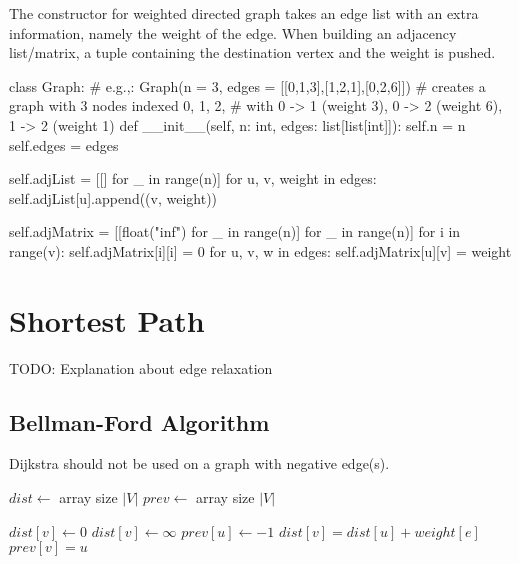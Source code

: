 The constructor for weighted directed graph takes an edge list with an extra information, namely the weight of the edge.
When building an adjacency list/matrix, a tuple containing the destination vertex and the weight is pushed.

\begin{python}
class Graph:
    # e.g.,: Graph(n = 3, edges = [[0,1,3],[1,2,1],[0,2,6]])
    # creates a graph with 3 nodes indexed 0, 1, 2,
    # with 0 -> 1 (weight 3), 0 -> 2 (weight 6), 1 -> 2 (weight 1)
    def __init__(self, n: int, edges: list[list[int]]):
        self.n = n
        self.edges = edges

        self.adjList = [[] for _ in range(n)]
        for u, v, weight in edges:
            self.adjList[u].append((v, weight))

        self.adjMatrix = [[float("inf") for _ in range(n)] for _ in range(n)]
        for i in range(v):
            self.adjMatrix[i][i] = 0
        for u, v, w in edges:
            self.adjMatrix[u][v] = weight
\end{python}

\section{Shortest Path}

TODO: Explanation about edge relaxation

\subsection{Bellman-Ford Algorithm}

Dijkstra should not be used on a graph with negative edge(s).

\noindent \hrulefill
\begin{algorithmic}[1]
   
    \State $dist \gets$ array size $|V|$
    \State $prev \gets$ array size $|V|$

        $dist[v] \gets 0$
      \EndIf
        $dist[v] \gets \infty$
      \EndIf
      \State $prev[u] \gets -1$
    \EndFor
       
          \State $dist[v] = dist[u] + weight[e]$
          \State $prev[v] = u$
        \EndIf
      \EndFor
    \EndFor
     
        \State {}
        \State \Return{}
      \EndIf
    \EndFor
  \EndFunction
\end{algorithmic}
\noindent \hrulefill

